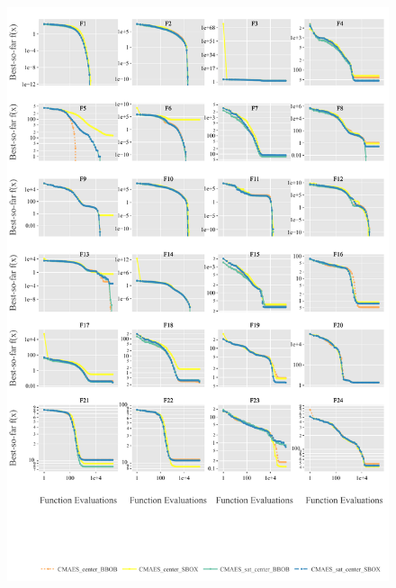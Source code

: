 \documentclass[sigconf=true, nonacm=false, review=true, anonymous = false,screen=true]{acmart}
\begin{document}
\begin{figure}
 \centering
 \includegraphics[width=.95\linewidth,trim=8mm 55mm 4mm 6mm,clip]{Figures/FCE_Mult-2023-03-30 (1).pdf}

\end{figure}
\end{document}
